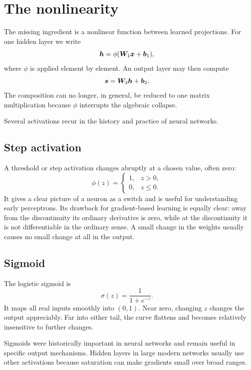 \section{The nonlinearity}

The missing ingredient is a nonlinear function between learned projections. For one hidden layer we write
\begin{equation}
  \bm{h}=\phi(\bm{W}_1\bm{x}+\bm{b}_1),
  \label{eq:week3-hidden}
\end{equation}
where \(\phi\) is applied element by element. An output layer may then compute
\begin{equation}
  \bm{s}=\bm{W}_2\bm{h}+\bm{b}_2.
  \label{eq:week3-output}
\end{equation}
The composition can no longer, in general, be reduced to one matrix multiplication because \(\phi\) interrupts the algebraic collapse.

Several activations recur in the history and practice of neural networks.

\subsection{Step activation}

A threshold or step activation changes abruptly at a chosen value, often zero:
\[
  \phi(z)=
  \begin{cases}
    1, & z>0,\\
    0, & z\le 0.
  \end{cases}
\]
It gives a clear picture of a neuron as a switch and is useful for understanding early perceptrons. Its drawback for gradient-based learning is equally clear: away from the discontinuity its ordinary derivative is zero, while at the discontinuity it is not differentiable in the ordinary sense. A small change in the weights usually causes no small change at all in the output.

\subsection{Sigmoid}

The logistic sigmoid is
\[
  \sigma(z)=\frac{1}{1+e^{-z}}.
\]
It maps all real inputs smoothly into \((0,1)\). Near zero, changing \(z\) changes the output appreciably. Far into either tail, the curve flattens and becomes relatively insensitive to further changes.

Sigmoids were historically important in neural networks and remain useful in specific output mechanisms. Hidden layers in large modern networks usually use other activations because saturation can make gradients small over broad ranges.

